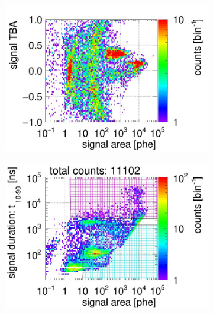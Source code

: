 \begin{landscape}
\begin{figure}[!p]
\begin{subfigure}[t]{0.32\textwidth}
			\includegraphics[width=\figurewidth,clip,trim={0 8 0 40}]{Figures/GasTest/CutsValid/res64767/tbapaX23Vecfig64767.jpg}
			\caption{}
			\label{fig:signal selection dv 12 02}
		\end{subfigure}
		\begin{subfigure}[t]{0.32\textwidth}
			\centering
			\includegraphics[width=\figurewidth,clip,trim={0 98 0 15}]{Figures/GasTest/CutsValid/res64767/pdpa26Vecfig64767.jpg}

\end{subfigure}
\end{figure}
\end{landscape}
